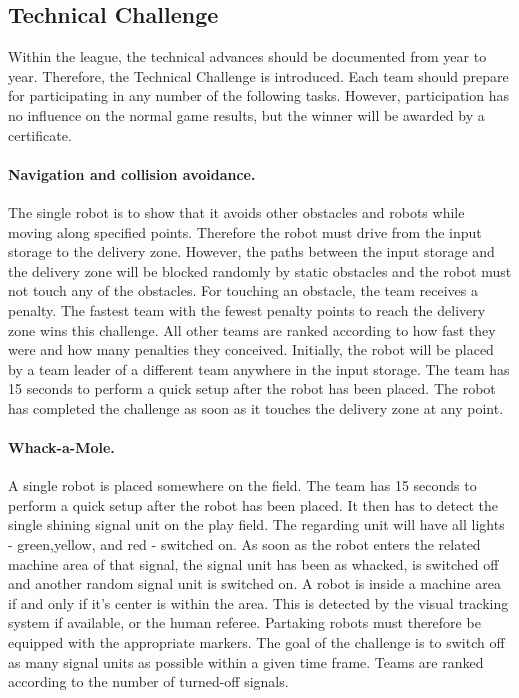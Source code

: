 \documentclass[12pt,twoside]{article}
\begin{document}
\subsection{Technical Challenge}
\label{sec:technical-challenge}
Within the league, the technical advances should be documented from
year to year. Therefore, the Technical Challenge is introduced. Each team should prepare for participating in any number of the following
tasks. However, participation has no influence on the normal game results, but the winner will be awarded by a certificate.


\paragraph{Navigation and collision avoidance.~}
The single robot is to show that it avoids other obstacles and robots
while moving along specified points. Therefore the robot must drive
from the input storage to the delivery zone. However, the paths
between the input storage and the delivery zone will be blocked
randomly by static obstacles and the robot must not touch any of the
obstacles. For touching an obstacle, the team receives a penalty.  The
fastest team with the fewest penalty points to reach the delivery zone
wins this challenge. All other teams are ranked according to how fast
they were and how many penalties they conceived. Initially, the robot
will be placed by a team leader of a different team anywhere in the
input storage. The team has 15 seconds to perform a quick setup after
the robot has been placed. The robot has completed the challenge as
soon as it touches the delivery zone at any point.
  
\paragraph{Whack-a-Mole.~}
A single robot is placed somewhere on the field. The team has 15 seconds
to perform a quick setup after the robot has been placed. It then has to
detect the single shining signal unit on the play field. The regarding
unit will have all lights - green,yellow, and red - switched on. As soon
as the robot enters the related machine area of that signal, the signal
unit has been as whacked, is switched off and another random signal unit
is switched on. A robot is inside a machine area if and only if it's
center is within the area. This is detected by the visual tracking
system if available, or the human referee. Partaking robots must
therefore be equipped with the appropriate markers. The goal of the
challenge is to switch off as many signal units as possible within a
given time frame. Teams are ranked according to the number of turned-off
signals.
  
\end{document}

